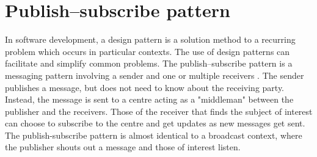 \section{Publish–subscribe pattern}
\label{chap:pubsub}
In software development, a design pattern is a solution method to a recurring problem which occurs in particular contexts. The use of design patterns can facilitate and simplify common problems. The publish–subscribe pattern is a messaging pattern involving a sender and one or multiple receivers \cite{pus_sub}. The sender publishes a message, but does not need to know about the receiving party. Instead, the message is sent to a centre acting as a "middleman" between the publisher and the receivers. Those of the receiver that finds the subject of interest can choose to subscribe to the centre and get updates as new messages get sent. The publish-subscribe pattern is almost identical to a broadcast context, where the publisher shouts out a message and those of interest listen.